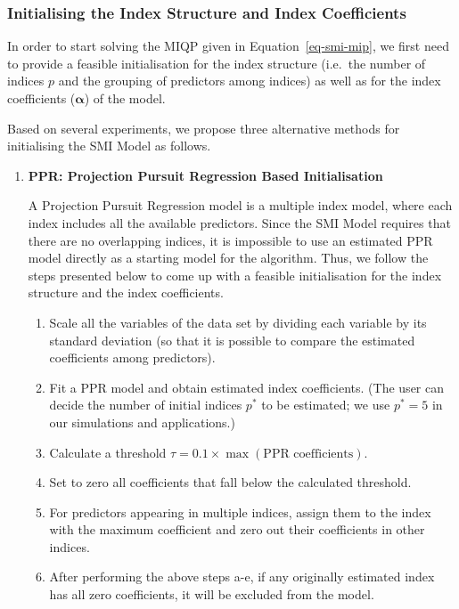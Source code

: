 \documentclass[
  11pt,
  a4paper,
]{article}
\providecommand{\tightlist}{%
  \setlength{\itemsep}{0pt}\setlength{\parskip}{0pt}}\usepackage{longtable,booktabs,array}
\begin{document}
\subsubsection{Initialising the Index Structure and Index
Coefficients}\label{sec-step1}

In order to start solving the MIQP given in Equation~\ref{eq-smi-mip},
we first need to provide a feasible initialisation for the index
structure (i.e.~the number of indices \(p\) and the grouping of
predictors among indices) as well as for the index coefficients
(\(\bm{\alpha}\)) of the model.

Based on several experiments, we propose three alternative methods for
initialising the SMI Model as follows.

\begin{enumerate}
\def\labelenumi{\arabic{enumi}.}
\item
  \textbf{PPR: Projection Pursuit Regression Based Initialisation}

  A Projection Pursuit Regression model \autocite{Friedman1981} is a
  multiple index model, where each index includes all the available
  predictors. Since the SMI Model requires that there are no overlapping
  indices, it is impossible to use an estimated PPR model directly as a
  starting model for the algorithm. Thus, we follow the steps presented
  below to come up with a feasible initialisation for the index
  structure and the index coefficients.

  \begin{enumerate}
  \def\labelenumii{\alph{enumii}.}
  \tightlist
  \item
    Scale all the variables of the data set by dividing each variable by
    its standard deviation (so that it is possible to compare the
    estimated coefficients among predictors).
  \item
    Fit a PPR model and obtain estimated index coefficients. (The user
    can decide the number of initial indices \(p^*\) to be estimated; we
    use \(p^* = 5\) in our simulations and applications.)
  \item
    Calculate a threshold
    \(\tau = 0.1 \times \max(\text{PPR coefficients})\).
  \item
    Set to zero all coefficients that fall below the calculated
    threshold.
  \item
    For predictors appearing in multiple indices, assign them to the
    index with the maximum coefficient and zero out their coefficients
    in other indices.
  \item
    After performing the above steps a-e, if any originally estimated
    index has all zero coefficients, it will be excluded from the model.
  \end{enumerate}


\end{enumerate}
\end{document}
